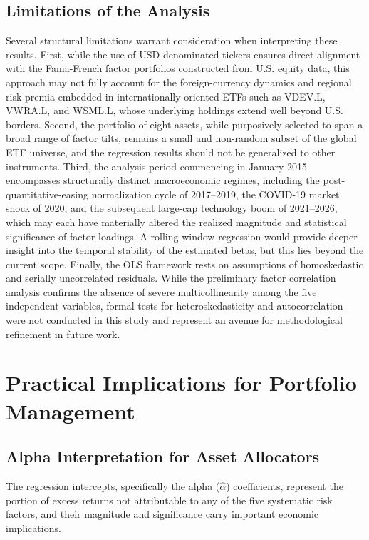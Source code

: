 \documentclass[12pt]{article}
\begin{document}
\subsection{Limitations of the Analysis}

Several structural limitations warrant consideration when interpreting these results. First, while the use of USD-denominated tickers ensures direct alignment with the Fama-French factor portfolios constructed from U.S. equity data, this approach may not fully account for the foreign-currency dynamics and regional risk premia embedded in internationally-oriented ETFs such as VDEV.L, VWRA.L, and WSML.L, whose underlying holdings extend well beyond U.S. borders. Second, the portfolio of eight assets, while purposively selected to span a broad range of factor tilts, remains a small and non-random subset of the global ETF universe, and the regression results should not be generalized to other instruments. Third, the analysis period commencing in January 2015 encompasses structurally distinct macroeconomic regimes, including the post-quantitative-easing normalization cycle of 2017--2019, the COVID-19 market shock of 2020, and the subsequent large-cap technology boom of 2021--2026, which may each have materially altered the realized magnitude and statistical significance of factor loadings.
 A rolling-window regression would provide deeper insight into the temporal stability of the estimated betas, but this lies beyond the current scope. Finally, the OLS framework rests on assumptions of homoskedastic and serially uncorrelated residuals. While the preliminary factor correlation analysis confirms the absence of severe multicollinearity among the five independent variables, formal tests for heteroskedasticity and autocorrelation were not conducted in this study and represent an avenue for methodological refinement in future work.

\section{Practical Implications for Portfolio Management}

\subsection{Alpha Interpretation for Asset Allocators}

The regression intercepts, specifically the alpha ($\hat{\alpha}$) coefficients, represent the portion of excess returns not attributable to any of the five systematic risk factors, and their magnitude and significance carry important economic implications. 
\end{document}
